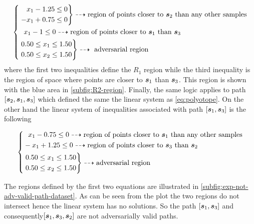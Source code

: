 \begin{equation}
\label{eq:polyotope}
\left\{\begin{aligned}
&\left.
    \begin{alignedat}{1}
      x_1& - 1.25 \le 0\\
      -x_1& + 0.75 \le 0\\
    \end{alignedat}
\right\}\dashrightarrow \text{region of points closer to } \sample[2] \text{ than any other samples}\\
&\ \,\,  x_1 - 1 \le 0 \dashrightarrow \text{region of points closer to } \sample[1] \text{ than } \sample[3]\\
&\left.
  \begin{alignedat}{1}
      0.50& \le x_1 \le 1.50\\
      0.50& \le x_2 \le 1.50
  \end{alignedat}
\right\}\dashrightarrow \text{ adversarial region}
\end{aligned}
  \right.
\end{equation}
where the first two inequalities define the $R_1$ region while the third inequality is the region of space where points are closer to $\sample[1]$ than $\sample[3]$. This region is shown with the blue area in \autoref{subfig:R2-region}. Finally, the same logic applies to path $[\sample[2], \sample[1], \sample[3]]$ which defined the same the linear system as \autoref{eq:polyotope}. On the other hand the linear system of inequalities associated with path $[\sample[1], \sample[3]]$ is the following

\begin{equation}
  \left\{\begin{aligned}
  &\ \ x_1 - 0.75 \le 0
  \dashrightarrow \text{region of points closer to } \sample[1] \text{ than any other samples}\\
  &-x_1 + 1.25 \le 0 \dashrightarrow \text{region of points closer to } \sample[3] \text{ than } \sample[2]\\
  &\left.
    \begin{alignedat}{1}
        0.50& \le x_1 \le 1.50\\
        0.50& \le x_2 \le 1.50
    \end{alignedat}
  \right\}\dashrightarrow \text{adversarial region}
  \end{aligned}
    \right.
\end{equation}

The regions defined by the first two equations are illustrated in \autoref{subfig:exp-not-adv-valid-path-dataset}. As can be seen from the plot the two regions do not intersect hence the linear system has no solutions. So the path $[\sample[1], \sample[3]]$ and consequently$[\sample[1], \sample[3], \sample[2]]$ are not adversarially valid paths.

